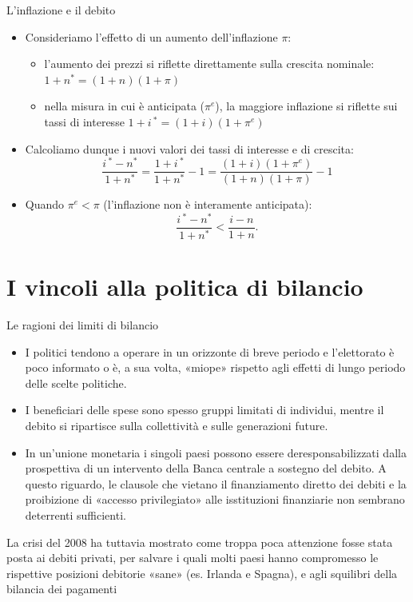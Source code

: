 \documentclass[aspectratio=149,11pt,italian]{beamer}
\begin{document}
\begin{frame}{L'inflazione e il debito}
\begin{itemize}
\item Consideriamo l'effetto di un aumento dell'inflazione $\pi$:
\begin{itemize}
\item l'aumento dei prezzi si riflette direttamente sulla
crescita nominale:  $1+n^*=(1+n)(1+\pi)$
\item nella misura in cui è anticipata ($\pi^e$), la maggiore inflazione si riflette sui
tassi di interesse $1+i\,^*=(1+i)(1+\pi^e)$
\end{itemize}
\item Calcoliamo dunque i nuovi valori dei tassi di interesse e di crescita:
\begin{equation*}
  \frac{i\,^*-n^*}{1+n^*} = \frac{1+i\,^*}{1+n^*}-1 = \frac{(1+i)(1+\pi^e)}{(1+n)(1+\pi)}-1
\end{equation*}
\item Quando $\pi^e<\pi$ (l'inflazione non è interamente anticipata):
\begin{equation*}
  \frac{i\,^*-n^*}{1+n^*} < \frac{i-n}{1+n}.
\end{equation*}
\end{itemize}
\end{frame}



\section{I vincoli alla politica di bilancio}

\begin{frame}{Le ragioni dei limiti di bilancio}
\begin{itemize}
\item I politici tendono a operare in un orizzonte di breve periodo e l'elettorato
è poco informato o è, a sua volta, «miope» rispetto agli effetti di lungo
periodo delle scelte politiche.
\item I beneficiari delle spese sono spesso gruppi limitati di individui, mentre
il debito si ripartisce sulla collettività e sulle generazioni future.
\item In un'unione monetaria i singoli paesi possono essere deresponsabilizzati
dalla prospettiva di un intervento della Banca centrale a sostegno del
debito. A questo riguardo, le clausole che vietano il finanziamento diretto
dei debiti e la proibizione di «accesso privilegiato» alle isstituzioni
finanziarie non sembrano deterrenti sufficienti.
\end{itemize}
\begin{block}{}
La crisi del 2008 ha tuttavia mostrato come troppa poca attenzione fosse stata
posta ai \alert{debiti privati}, per salvare i quali molti paesi hanno compromesso
le rispettive posizioni debitorie «sane» (es. Irlanda e Spagna), e agli
\alert{squilibri della bilancia dei pagamenti}
\end{block}
\end{frame}
\end{document}
